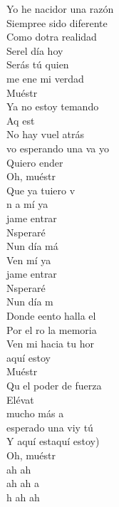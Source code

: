 \begin{cancion}
	Yo he nacidor una razón\\
	Siempree sido diferente	\\
	Como dotra realidad\\
	Serel día hoy\\
Serás tú quien\\
	me ene mi verdad  \\
	Muéstr   \\
	Ya no estoy temando\\
	Aq est\\
	No hay vuel atrás\\
	vo esperando una va yo\\
	Quiero ender       \\
	Oh, muéstr   \\
	Que ya tuiero v\\
	n a mí ya\\
	jame entrar \\
	Nsperaré\\
	Nun día má\\
	Ven mí ya\\
	jame entrar \\
	Nsperaré\\
	Nun día m         \\
	Donde eento halla el\\
	Por el ro la memoria\\
	Ven mi hacia tu hor\\
aquí estoy\\
	Muéstr    \\
	Qu el poder de fuerza\\
	Elévat    \\
	mucho más a \\
	 esperado una viy tú\\
	Y aquí estaquí estoy)         \\
	Oh, muéstr   \\
	ah ah\\
	ah ah a\\
	h ah ah\\
\end{cancion}%
